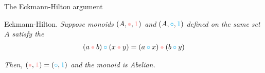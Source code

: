 \begin{frame}[t]{The Eckmann-Hilton argument}

  \par{} Eckmann-Hilton. \textit{Suppose monoids $(A, \textcolor{pink}{\bullet}, \textcolor{pink}{\mathbf{1}})$ and $(A, \textcolor{cyan}{\circ}, \textcolor{cyan}{1})$ defined on the same set $A$ satisfy the }
  \begin{align*}
    (a \mathbin{\textcolor{pink}{\bullet}} b)
    \mathbin{\textcolor{cyan}{\circ}}
    (x \mathbin{\textcolor{pink}{\bullet}} y)
    = (a \mathbin{\textcolor{cyan}{\circ}} x)
    \mathbin{\textcolor{pink}{\bullet}}
    (b \mathbin{\textcolor{cyan}{\circ}} y)
  \end{align*}
  \par \textit{Then, $(\textcolor{pink}{\bullet}, \textcolor{pink}{\mathbf{1}}) = (\textcolor{cyan}{\circ}, \textcolor{cyan}{1})$ and the monoid is Abelian.}
  \vspace{0.25 \baselineskip}
  \par{} 

\end{frame}
